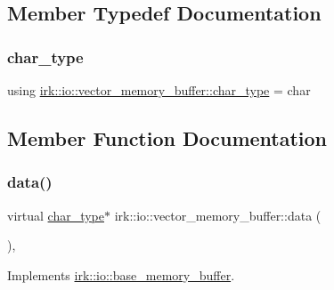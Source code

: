 \subsection{Member Typedef Documentation}
\mbox{\label{classirk_1_1io_1_1vector__memory__buffer_a3ad38262653ef0610f281f5a321c05de}} 
\subsubsection{\texorpdfstring{char\+\_\+type}{char\_type}}
{\footnotesize\ttfamily using \mbox{\hyperlink{classirk_1_1io_1_1vector__memory__buffer_a3ad38262653ef0610f281f5a321c05de}{irk\+::io\+::vector\+\_\+memory\+\_\+buffer\+::char\+\_\+type}} =  char}



\subsection{Member Function Documentation}
\mbox{\label{classirk_1_1io_1_1vector__memory__buffer_a28ddafbb2610a463d13dc7fe5cf0708f}} 
\subsubsection{\texorpdfstring{data()}{data()}\hspace{0.1cm}{\footnotesize\ttfamily [1/2]}}
{\footnotesize\ttfamily virtual \mbox{\hyperlink{classirk_1_1io_1_1base__memory__buffer_a1b539180df4274dd4ad0402a0ac821ec}{char\+\_\+type}}$\ast$ irk\+::io\+::vector\+\_\+memory\+\_\+buffer\+::data (\begin{DoxyParamCaption}{ }\end{DoxyParamCaption})\hspace{0.3cm}{\ttfamily [inline]}, {\ttfamily [virtual]}}



Implements \mbox{\hyperlink{classirk_1_1io_1_1base__memory__buffer_ae8247b83aae579cbc04b5432bd4858cc}{irk\+::io\+::base\+\_\+memory\+\_\+buffer}}.

